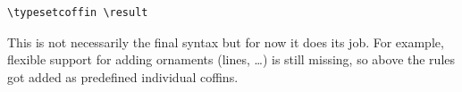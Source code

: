 \documentclass{article}
\begin{document}
\begin{center}
\begin{minipage}{14cm}
\begin{verbatim}
\typesetcoffin \result
\end{verbatim}

This is not necessarily the final syntax but for now it does its job. For
example, flexible support for adding ornaments (lines, \ldots) is still
missing, so above the rules got added as predefined individual coffins.

\end{minipage}
\end{center}
\end{document}
